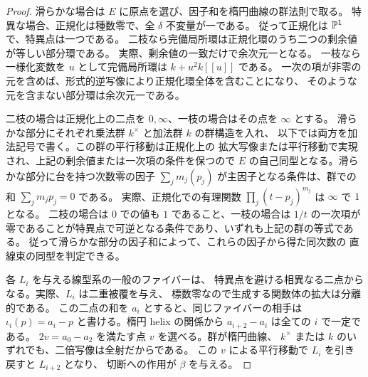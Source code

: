 \begin{proof}
滑らかな場合は $E$ に原点を選び、因子和を楕円曲線の群法則で取る。
特異な場合、正規化は種数零で、全 $\delta$ 不変量が一である。
従って正規化は $\mathbb P^1$ で、特異点は一つである。
二枝なら完備局所環は正規化環のうち二つの剰余値が等しい部分環である。
実際、剰余値の一致だけで余次元一となる。
一枝なら一様化変数を $u$ として完備局所環は $k+u^2 k[[u]]$ である。
一次の項が非零の元を含めば、形式的逆写像により正規化環全体を含むことになり、
そのような元を含まない部分環は余次元一である。

二枝の場合は正規化上の二点を $0,\infty$、一枝の場合はその点を $\infty$ とする。
滑らかな部分にそれぞれ乗法群 $k^\times$ と加法群 $k$ の群構造を入れ、
以下では両方を加法記号で書く。この群の平行移動は正規化上の
拡大写像または平行移動で実現され、上記の剰余値または一次項の条件を保つので
$E$ の自己同型となる。滑らかな部分に台を持つ次数零の因子
$\sum_j m_j (p_j)$ が主因子となる条件は、群での和 $\sum_j m_j p_j=0$ である。
実際、正規化での有理関数 $\prod_j(t-p_j)^{m_j}$ は $\infty$ で $1$ となる。
二枝の場合は $0$ での値も $1$ であること、一枝の場合は $1/t$ の一次項が
零であることが特異点で可逆となる条件であり、いずれも上記の群の等式である。
従って滑らかな部分の因子和によって、これらの因子から得た同次数の
直線束の同型を判定できる。

各 $L_i$ を与える線型系の一般のファイバーは、
特異点を避ける相異なる二点からなる。実際、$L_i$ は二重被覆を与え、
標数零なので生成する関数体の拡大は分離的である。
この二点の和を $a_i$ とすると、同じファイバーの相手は
$\iota_i(p)=a_i-p$ と書ける。楕円 helix の関係から
$a_{i+2}-a_i$ は全ての $i$ で一定である。
$2v=a_0-a_2$ を満たす点 $v$ を選べる。群が楕円曲線、
$k^\times$ または $k$ のいずれでも、二倍写像は全射だからである。
この $v$ による平行移動で $L_i$ を引き戻すと $L_{i+2}$ となり、
切断への作用が $\beta$ を与える。


\end{proof}
